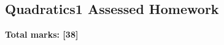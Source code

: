 \documentclass[../c1]{subfiles}
\begin{document}
\subsection*{Quadratics1 Assessed Homework}
\thispagestyle{fancy}



\begin{flushright}
\textbf{Total marks: [38]}
\end{flushright}
\end{document}
